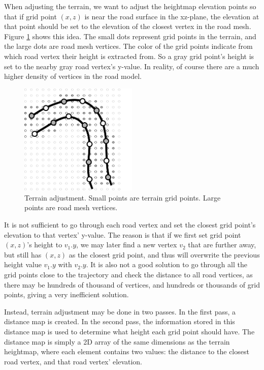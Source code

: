When adjusting the terrain, we want to adjust the heightmap elevation points so that if grid point $(x,z)$ is near the road surface in the xz-plane, the elevation at that point should be set to the elevation of the closest vertex in the road mesh. Figure \ref{fig:terrain_adjustment} shows this idea. The small dots represent grid points in the terrain, and the large dots are road mesh vertices. The color of the grid points indicate from which road vertex their height is extracted from. So a gray grid point's height is set to the nearby gray road vertex's y-value. In reality, of course there are a much higher density of vertices in the road model.

\begin{figure}[ht]
\centering
\includegraphics[width=0.5\textwidth]{figure/terrain_adjustment}
\caption{Terrain adjustment. Small points are terrain grid points. Large points are road mesh vertices.}
\label{fig:terrain_adjustment}
\end{figure}

It is not sufficient to go through each road vertex and set the closest grid point's elevation to that vertex' y-value. The reason is that if we first set grid point $(x,z)$'s height to $v_1.y$, we may later find a new vertex $v_2$ that are further away, but still has $(x,z)$ as the closest grid point, and thus will overwrite the previous height value $v_1.y$ with $v_2.y$. It is also not a good solution to go through all the grid points close to the trajectory and check the distance to all road vertices, as there may be hundreds of thousand of vertices, and hundreds or thousands of grid points, giving a very inefficient solution. 

Instead, terrain adjustment may be done in two passes. In the first pass, a distance map is created. In the second pass, the information stored in this distance map is used to determine what height each grid point should have. The distance map is simply a 2D array of the same dimensions as the terrain heightmap, where each element contains two values: the distance to the closest road vertex, and that road vertex' elevation. 

